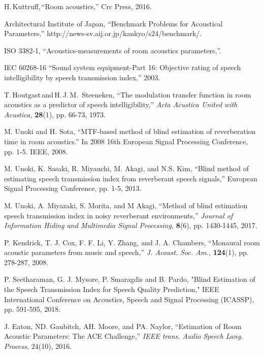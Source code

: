 \documentclass[conference]{IEEEtran}
\begin{document}
	\begin{thebibliography}{99}
		H.\,Kuttruff,\,``Room acoustics,'' Crc Press, 2016. 
		
		Architectural Institute of Japan, ``Benchmark Problems for Acoustical Parameters,'' http://news-sv.aij.or.jp/kankyo/s24/benchmark/.
		
		ISO 3382-1, ``Acoustics-measurements of room acoustics parameters,''.%
		
		IEC 60268-16 ``Sound system equipment-Part 16: Objective rating of speech intelligibility by speech transmission index,'' 2003.
		
		T.\,Houtgast\,and\,H.\,J.\,M.~Steeneken, ``The modulation transfer function in room acoustics as a predictor of speech intelligibility,'' {\em{Acta Acustica United with Acustica,}} \textbf{28}(1), pp. 66-73, 1973.
		
		M. Unoki and H. Sota, ``MTF-based method of blind estimation of reverberation time in room acoustics.'' In 2008 16th European Signal Processing Conference, pp. 1-5. IEEE, 2008.
		
		M. Unoki, K. Sasaki, R. Miyauchi, M. Akagi, and N.S. Kim, ``Blind method of estimating speech transmission index from reverberant speech signals,'' European Signal Processing Conference, pp. 1-5, 2013.
		
		M. Unoki, A. Miyazaki, S. Morita, and M Akagi, ``Method of blind estimation speech transmission index in noisy reverberant environments,'' {\em{Journal of Information Hiding and Multimedia Signal Processing,}} \textbf{8}(6), pp. 1430-1445, 2017. 
		
		P. Kendrick, T. J. Cox, F. F. Li, Y. Zhang, and J. A. Chambers, ``Monaural room acoustic parameters from music and speech,'' {\em{J. Acoust. Soc. Am.,}} \textbf{124}(1), pp. 278-287, 2008.
		
		P. Seetharaman, G. J. Mysore, P. Smaragdis and B. Pardo, "Blind Estimation of the Speech Transmission Index for Speech Quality Prediction,"  IEEE International Conference on Acoustics, Speech and Signal Processing (ICASSP), pp. 591-595, 2018. 
		
		J. Eaton, ND. Gaubitch, AH. Moore, and PA. Naylor, ``Estimation of Room Acoustic Parameters: The ACE Challenge,'' {\em{IEEE trans. Audio Speech Lang. Process,}} 24(10), 2016.
		

\end{thebibliography}
\end{document}
